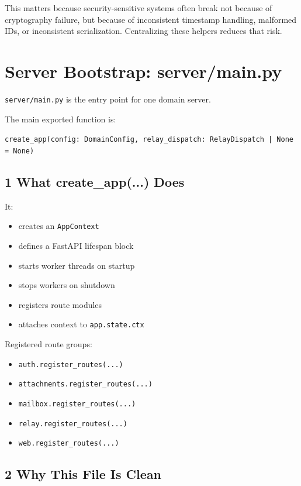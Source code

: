 \documentclass[11pt,a4paper]{article}
\begin{document}
This matters because security-sensitive systems often break not because of cryptography failure, but because of inconsistent timestamp handling, malformed IDs, or inconsistent serialization. Centralizing these helpers reduces that risk.


\section{Server Bootstrap: server/main.py}

\nolinkurl{server/main.py} is the entry point for one domain server.

The main exported function is:

\nolinkurl{create_app(config: DomainConfig, relay_dispatch: RelayDispatch | None = None)}

\subsection{1 What create\_app(...) Does}

It:

\begin{itemize}
\item creates an \nolinkurl{AppContext}
\item defines a FastAPI lifespan block
\item starts worker threads on startup
\item stops workers on shutdown
\item registers route modules
\item attaches context to \nolinkurl{app.state.ctx}
\end{itemize}

Registered route groups:

\begin{itemize}
\item \nolinkurl{auth.register_routes(...)}
\item \nolinkurl{attachments.register_routes(...)}
\item \nolinkurl{mailbox.register_routes(...)}
\item \nolinkurl{relay.register_routes(...)}
\item \nolinkurl{web.register_routes(...)}
\end{itemize}

\subsection{2 Why This File Is Clean}
\end{document}
